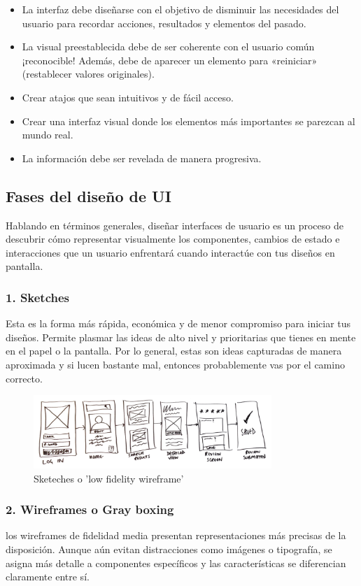 \documentclass[11pt]{article}
\begin{document}
\begin{itemize}
\item La interfaz debe diseñarse con el objetivo de disminuir las necesidades del usuario para recordar acciones, resultados y elementos del pasado.
\item La visual preestablecida debe de ser coherente con el usuario común ¡reconocible! Además, debe de aparecer un elemento para «reiniciar» (restablecer valores originales).
\item Crear atajos que sean intuitivos y de fácil acceso.
\item Crear una interfaz visual donde los elementos más importantes se parezcan al mundo real.
\item La información debe ser revelada de manera progresiva.
\end{itemize}

\subsection{Fases del diseño de UI}
\label{sec:org170e85c}
\autocite{Alli_2022} Hablando en términos generales, diseñar interfaces de 
usuario es un proceso de descubrir cómo representar visualmente los 
componentes, cambios de estado e interacciones que un usuario enfrentará cuando 
interactúe con tus diseños en pantalla.

\subsubsection{1. Sketches}
\label{sec:org45c8a23}
Esta es la forma más rápida, económica y de menor compromiso para iniciar tus 
diseños. Permite plasmar las ideas de alto nivel y prioritarias que tienes en 
mente en el papel o la pantalla. Por lo general, estas son ideas capturadas de 
manera aproximada y si lucen bastante mal, entonces probablemente vas por el 
camino correcto.

\begin{figure}[htbp]
\centering
\includegraphics[width=9cm]{images/sketch.png}
\caption{Sketeches o 'low fidelity wireframe'}
\end{figure}

\subsubsection{2. Wireframes o Gray boxing}
\label{sec:orge4e02b2}
los wireframes de fidelidad media presentan representaciones más precisas de la 
disposición. Aunque aún evitan distracciones como imágenes o tipografía, se 
asigna más detalle a componentes específicos y las características se 
diferencian claramente entre sí.
\end{document}
